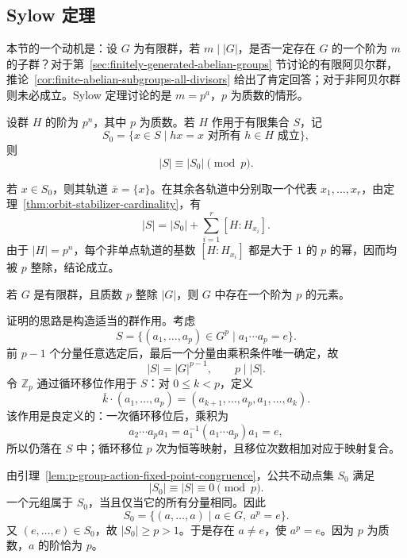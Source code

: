 \subsection{Sylow 定理}\label{sec:sylow-theorems}


本节的一个动机是：设 $G$ 为有限群，若 $m\mid |G|$，是否一定存在 $G$ 的一个阶为 $m$ 的子群？对于第~\ref{sec:finitely-generated-abelian-groups} 节讨论的有限阿贝尔群，推论~\ref{cor:finite-abelian-subgroups-all-divisors} 给出了肯定回答；对于非阿贝尔群则未必成立。Sylow 定理讨论的是 $m=p^a$，$p$ 为质数的情形。

\begin{lemma}\label{lem:p-group-action-fixed-point-congruence}
设群 $H$ 的阶为 $p^n$，其中 $p$ 为质数。若 $H$ 作用于有限集合 $S$，记
\[
  S_0=\{x\in S\mid hx=x\text{ 对所有 }h\in H\text{ 成立}\},
\]
则
\[
  |S|\equiv |S_0|\pmod p.
\]
\end{lemma}

\begin{purpleproof}
若 $x\in S_0$，则其轨道 $\bar x=\{x\}$。在其余各轨道中分别取一个代表 $x_1,\ldots,x_r$，由定理~\ref{thm:orbit-stabilizer-cardinality}，有
\[
  |S|=|S_0|+\sum_{i=1}^{r}[H:H_{x_i}].
\]
由于 $|H|=p^n$，每个非单点轨道的基数 $[H:H_{x_i}]$ 都是大于 $1$ 的 $p$ 的幂，因而均被 $p$ 整除，结论成立。
\end{purpleproof}

\begin{theorem}[Cauchy]\label{thm:cauchy-prime-order-element}
若 $G$ 是有限群，且质数 $p$ 整除 $|G|$，则 $G$ 中存在一个阶为 $p$ 的元素。
\end{theorem}

\begin{purpleproof}
证明的思路是构造适当的群作用。考虑
\[
  S=\{(a_1,\ldots,a_p)\in G^p\mid a_1\cdots a_p=e\}.
\]
前 $p-1$ 个分量任意选定后，最后一个分量由乘积条件唯一确定，故
\[
  |S|=|G|^{p-1},\qquad p\mid |S|.
\]
令 $\mathbb Z_p$ 通过循环移位作用于 $S$：对 $0\leq k<p$，定义
\[
  \bar k\cdot(a_1,\ldots,a_p)
    =(a_{k+1},\ldots,a_p,a_1,\ldots,a_k).
\]
该作用是良定义的：一次循环移位后，乘积为
\[
  a_2\cdots a_pa_1=a_1^{-1}(a_1\cdots a_p)a_1=e,
\]
所以仍落在 $S$ 中；循环移位 $p$ 次为恒等映射，且移位次数相加对应于映射复合。

由引理~\ref{lem:p-group-action-fixed-point-congruence}，公共不动点集 $S_0$ 满足
\[
  |S_0|\equiv |S|\equiv0\pmod p.
\]
一个元组属于 $S_0$，当且仅当它的所有分量相同。因此
\[
  S_0=\{(a,\ldots,a)\mid a\in G,\ a^p=e\}.
\]
又 $(e,\ldots,e)\in S_0$，故 $|S_0|\geq p>1$。于是存在 $a\ne e$，使 $a^p=e$。因为 $p$ 为质数，$a$ 的阶恰为 $p$。
\end{purpleproof}

